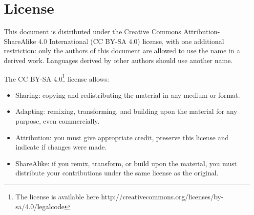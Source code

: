 \newpage

\section{License}
\label{license}

This document is distributed under the Creative Commons Attribution-ShareAlike
4.0 International (CC BY-SA 4.0) license, with one additional restriction:
only the authors of this document are allowed to use the name \pencil
in a derived work.  Languages derived by other authors should use another
name.

The CC BY-SA 4.0\footnote{The license is available here
http://creativecommons.org/licenses/by-sa/4.0/legalcode} license allows:
\begin{itemize}
 \item Sharing: copying and redistributing the material in any medium or
 format.
 \item Adapting: remixing, transforming, and building upon the material
 for any purpose, even commercially.
 \item Attribution: you must give appropriate credit, preserve
 this license and indicate if changes were made.
 \item ShareAlike: if you remix, transform, or build upon the material,
 you must distribute your contributions under the same license as the
 original.
\end{itemize}

